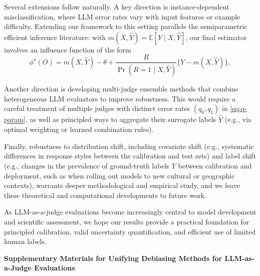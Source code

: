 \documentclass[11pt]{article}
\newcommand{\E}{\mathbb{E}}
\newcommand{\1}{\mathbf{1}}
\theoremstyle{remark}
\begin{document}
Several extensions follow naturally.
A key direction is instance-dependent misclassification, where LLM error rates vary with input features or example difficulty.
Extending our framework to this setting parallels the semiparametric efficient inference literature: with
$m(X,\hat Y) = \E[Y \mid X,\hat Y]$, our final estimator involves an influence function of the form
\begin{equation}
\label{eq:eif-instance-dependent}
\phi^\star(O)
= m(X,\hat Y) - \theta
+ \frac{R}{\Pr(R=1 \mid X,\hat Y)}\{Y - m(X,\hat Y)\},
\end{equation}

Another direction is developing multi-judge ensemble methods that combine heterogeneous LLM evaluators to improve robustness.
This would require a careful treatment of multiple judges with distinct error rates $(q_0, q_1)$ in \eqref{eq:q-param}, as well as principled ways to aggregate their surrogate labels $\hat Y$ (e.g., via optimal weighting or learned combination rules).

Finally, robustness to distribution shift, including covariate shift (e.g., systematic differences in response styles between the calibration and test sets) and label shift (e.g., changes in the prevalence of ground-truth labels $Y$ between calibration and deployment, such as when rolling out models to new cultural or geographic contexts), warrants deeper methodological and empirical study, and we leave these theoretical and computational developments to future work.

As LLM-as-a-judge evaluations become increasingly central to model development and scientific assessment, we hope our results provide a practical foundation for principled calibration, valid uncertainty quantification, and efficient use of limited human labels.

\clearpage





\clearpage

\appendix
\begin{center}
    \textbf{\Large Supplementary Materials for Unifying Debiasing Methods for LLM-as-a-Judge Evaluations}
\end{center}


\end{document}
